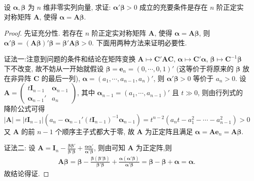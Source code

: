 \documentclass[../../main.tex]{subfiles}%
\begin{document}
\begin{proposition}
设 \(\boldsymbol{\alpha},\boldsymbol{\beta}\) 为 \(n\) 维非零实列向量, 求证: \(\boldsymbol{\alpha}'\boldsymbol{\beta}>0\) 成立的充要条件是存在 \(n\) 阶正定实对称矩阵 \(\boldsymbol{A}\), 使得 \(\boldsymbol{\alpha}=\boldsymbol{A}\boldsymbol{\beta}\).
\end{proposition}
\begin{proof}

先证充分性. 若存在 \(n\) 阶正定实对称矩阵 \(\boldsymbol{A}\), 使得 \(\boldsymbol{\alpha}=\boldsymbol{A}\boldsymbol{\beta}\), 则 \(\boldsymbol{\alpha}'\boldsymbol{\beta}=(\boldsymbol{A}\boldsymbol{\beta})'\boldsymbol{\beta}=\boldsymbol{\beta}'\boldsymbol{A}\boldsymbol{\beta}>0\). 下面用两种方法来证明必要性.

{\color{blue}证法一:}注意到问题的条件和结论在矩阵变换 \(\boldsymbol{A}\mapsto\boldsymbol{C}'\boldsymbol{A}\boldsymbol{C}\), \(\boldsymbol{\alpha}\mapsto\boldsymbol{C}'\boldsymbol{\alpha}\), \(\boldsymbol{\beta}\mapsto\boldsymbol{C}^{-1}\boldsymbol{\beta}\) 下不改变, 故不妨从一开始就假设 \(\boldsymbol{\beta}=\boldsymbol{e}_n=(0,\cdots,0,1)'\) (这等价于将原来的 \(\boldsymbol{\beta}\) 放在非异阵 \(\boldsymbol{C}\) 的最后一列), \(\boldsymbol{\alpha}=(a_1,\cdots,a_{n - 1},a_n)'\), 则 \(\boldsymbol{\alpha}'\boldsymbol{\beta}>0\) 等价于 \(a_n>0\). 设 \(\boldsymbol{A}=\begin{pmatrix}t\boldsymbol{I}_{n - 1}&\boldsymbol{\alpha}_{n - 1}\\\boldsymbol{\alpha}_{n - 1}'&a_n\end{pmatrix}\), 其中 \(\boldsymbol{\alpha}_{n - 1}=(a_1,\cdots,a_{n - 1})'\) 且 \(t\gg0\), 则由行列式的降阶公式可得
\[|\boldsymbol{A}|=|t\boldsymbol{I}_{n - 1}|(a_n-\boldsymbol{\alpha}_{n - 1}'(t\boldsymbol{I}_{n - 1})^{-1}\boldsymbol{\alpha}_{n - 1})=t^{n - 2}(a_nt - a_1^2-\cdots - a_{n - 1}^2)>0\]
又 \(\boldsymbol{A}\) 的前 \(n - 1\) 个顺序主子式都大于零, 故 \(\boldsymbol{A}\) 为正定阵且满足 \(\boldsymbol{\alpha}=\boldsymbol{A}\boldsymbol{e}_n=\boldsymbol{A}\boldsymbol{\beta}\).

{\color{blue}证法二:} 设 \(\boldsymbol{A}=\boldsymbol{I}_n-\frac{\boldsymbol{\beta}\boldsymbol{\beta}'}{\boldsymbol{\beta}'\boldsymbol{\beta}}+\frac{\boldsymbol{\alpha}\boldsymbol{\alpha}'}{\boldsymbol{\alpha}'\boldsymbol{\beta}}\), 则由可知 \(\boldsymbol{A}\) 为正定阵,则
\begin{align*}
\boldsymbol{A\beta }=\boldsymbol{\beta }-\frac{\boldsymbol{\beta }\left( \boldsymbol{\beta }' \boldsymbol{\beta } \right)}{\boldsymbol{\beta }' \boldsymbol{\beta }}+\frac{\boldsymbol{\alpha }\left( \boldsymbol{\alpha }' \boldsymbol{\beta } \right)}{\boldsymbol{\alpha }'\boldsymbol{\beta }}=\boldsymbol{\beta }-\boldsymbol{\beta }+\boldsymbol{\alpha }=\boldsymbol{\alpha }.
\end{align*}
故结论得证.

\end{proof}
\end{document}
